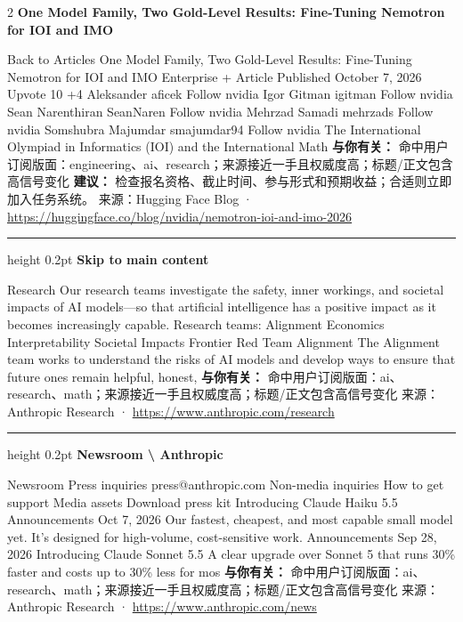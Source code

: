 \documentclass[10.5pt]{ctexart}
\begin{document}
\begin{multicols}{2}
{\large\bfseries One Model Family, Two Gold-Level Results: Fine-Tuning Nemotron for IOI and IMO}\par
Back to Articles One Model Family, Two Gold-Level Results: Fine-Tuning Nemotron for IOI and IMO Enterprise + Article Published October 7, 2026 Upvote 10 +4 Aleksander aficek Follow nvidia Igor Gitman igitman Follow nvidia Sean Narenthiran SeanNaren Follow nvidia Mehrzad Samadi mehrzads Follow nvidia Somshubra Majumdar smajumdar94 Follow nvidia The International Olympiad in Informatics (IOI) and the International Math
\textbf{与你有关：} 命中用户订阅版面：engineering、ai、research；来源接近一手且权威度高；标题/正文包含高信号变化
\textbf{建议：} 检查报名资格、截止时间、参与形式和预期收益；合适则立即加入任务系统。
{\footnotesize\color{ormuted} 来源：Hugging Face Blog · \url{https://huggingface.co/blog/nvidia/nemotron-ioi-and-imo-2026}}
\vspace{2mm}
\hrule height 0.2pt
\vspace{2mm}
{\large\bfseries Skip to main content}\par
Research Our research teams investigate the safety, inner workings, and societal impacts of AI models—so that artificial intelligence has a positive impact as it becomes increasingly capable. Research teams: Alignment Economics Interpretability Societal Impacts Frontier Red Team Alignment The Alignment team works to understand the risks of AI models and develop ways to ensure that future ones remain helpful, honest, 
\textbf{与你有关：} 命中用户订阅版面：ai、research、math；来源接近一手且权威度高；标题/正文包含高信号变化
{\footnotesize\color{ormuted} 来源：Anthropic Research · \url{https://www.anthropic.com/research}}
\vspace{2mm}
\hrule height 0.2pt
\vspace{2mm}
{\large\bfseries Newsroom \textbackslash{} Anthropic}\par
Newsroom Press inquiries press@anthropic.com Non-media inquiries How to get support Media assets Download press kit Introducing Claude Haiku 5.5 Announcements Oct 7, 2026 Our fastest, cheapest, and most capable small model yet. It’s designed for high-volume, cost-sensitive work. Announcements Sep 28, 2026 Introducing Claude Sonnet 5.5 A clear upgrade over Sonnet 5 that runs 30\% faster and costs up to 30\% less for mos
\textbf{与你有关：} 命中用户订阅版面：ai、research、math；来源接近一手且权威度高；标题/正文包含高信号变化
{\footnotesize\color{ormuted} 来源：Anthropic Research · \url{https://www.anthropic.com/news}}

\end{multicols}
\end{document}
